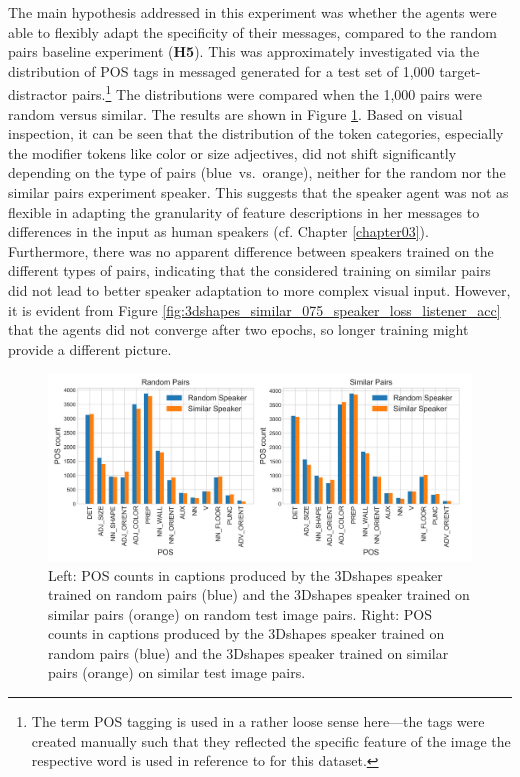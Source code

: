 The main hypothesis addressed in this experiment was whether the agents were able to flexibly adapt the specificity of their messages, compared to the random pairs baseline experiment (\textbf{H5}). This was approximately investigated via the distribution of POS tags in messaged generated for a test set of 1,000 target-distractor pairs.\footnote{The term POS tagging is used in a rather loose sense here---the tags were created manually such that they reflected the specific feature of the image the respective word is used in reference to for this dataset.} The distributions were compared when the 1,000 pairs were random versus similar. The results are shown in Figure \ref{fig:3dshapes_pos}. Based on visual inspection, it can be seen that the distribution of the token categories, especially the modifier tokens like color or size adjectives, did not shift significantly depending on the type of pairs (blue~vs.~orange), neither for the random nor the similar pairs experiment speaker. This suggests that the speaker agent was not as flexible in adapting the granularity of feature descriptions in her messages to differences in the input as human speakers (cf. Chapter \ref{chapter03}). Furthermore, there was no apparent difference between speakers trained on the different types of pairs, indicating that the considered training on similar pairs did not lead to better speaker adaptation to more complex visual input. However, it is evident from Figure \ref{fig:3dshapes_similar_075_speaker_loss_listener_acc} that the agents did not converge after two epochs, so longer training might provide a different picture.

\begin{figure}[h]
	\centering
	\includegraphics[width=\linewidth]{images/3dshapes_random_vs_similar_POS_counts_fixed.png}
	\caption{Left: POS counts in captions produced by the 3Dshapes speaker trained on random pairs (blue) and the 3Dshapes speaker trained on similar pairs (orange) on random test image pairs. Right: POS counts in captions produced by the 3Dshapes speaker trained on random pairs (blue) and the 3Dshapes speaker trained on similar pairs (orange) on similar test image pairs.}
	\label{fig:3dshapes_pos}
\end{figure}

